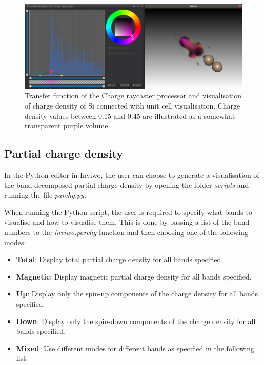 \documentclass[a4paper,12pt]{article}
\begin{document}
\begin{figure} [H]
\centering
\includegraphics[scale=0.4]{screenshot_transfer_function_transparent.png}
\caption{Transfer function of the Charge raycaster processor and visualisation of charge density of Si connected with unit cell visualisation. Charge density values between 0.15 and 0.45 are illustrated as a somewhat transparent purple volume.}
\label{fig:screenshot_transfer_function}
\end{figure}

\subsection{Partial charge density}
In the Python editor in Inviwo, the user can choose to generate a visualisation of the band decomposed partial charge density by opening the folder \textit{scripts} and running the file \textit{parchg.py}.

When running the Python script, the user is required to specify what bands to visualise and how to visualise them. This is done by passing a list of the band numbers to the \textit{inviwo.parchg} function and then choosing one of the following modes:

\begin{itemize}
    \item \textbf{Total}: Display total partial charge density for all bands specified. 
    \item \textbf{Magnetic}: Display magnetic partial charge density for all bands specified. 
    \item \textbf{Up}: Display only the spin-up components of the charge density for all bands specified. 
    \item \textbf{Down}: Display only the spin-down components of the charge density for all bands specified. 
    \item \textbf{Mixed}: Use different modes for different bands as specified in the following list. 
\end{itemize}
\end{document}
